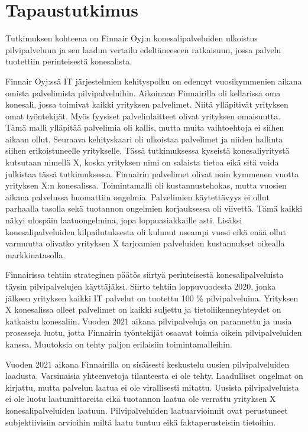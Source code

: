 \chapter{Tapaustutkimus\label{tapautustutkimus}}
Tutkimuksen kohteena on Finnair Oyj:n konesalipalveluiden ulkoistus pilvipalveluun ja sen laadun vertailu edeltäneeseen ratkaisuun, jossa palvelu tuotettiin perinteisestä konesalista.

Finnair Oyj:ssä IT järjestelmien kehityspolku on edennyt vuosikymmenien aikana omista palvelimista pilvipalveluihin. Aikoinaan Finnairilla oli kellarissa oma konesali, jossa toimivat kaikki yrityksen palvelimet. Niitä ylläpitivät yrityksen omat työntekijät. Myös fyysiset palvelinlaitteet olivat yrityksen omaisuutta. Tämä malli ylläpitää palvelimia oli kallis, mutta muita vaihtoehtoja ei siihen aikaan ollut. Seuraava kehityskaari oli ulkoistaa palvelimet ja niiden hallinta siihen erikoistuneelle yritykselle. Tässä tutkimuksessa kyseistä konesaliyritystä kutsutaan nimellä X, koska yrityksen nimi on salaista tietoa eikä sitä voida julkistaa tässä tutkimuksessa. Finnairin palvelimet olivat noin kymmenen vuotta yrityksen X:n konesalissa. Toimintamalli oli kustannustehokas, mutta vuosien aikana palvelussa huomattiin ongelmia. Palvelimien käytettävyys ei ollut parhaalla tasolla sekä tuotannon ongelmien korjauksessa oli viivettä. Tämä kaikki näkyi ulospäin laatuongelmina, jopa loppuasiakkaille asti. Lisäksi konesalipalveluiden kilpailutuksesta oli kulunut useampi vuosi eikä enää ollut varmuutta olivatko yrityksen X tarjoamien palveluiden kustannukset oikealla markkinatasolla.

Finnairissa tehtiin strateginen päätös siirtyä perinteisestä konesalipalveluista täysin pilvipalvelujen käyttäjäksi. Siirto tehtiin loppuvuodesta 2020, jonka jälkeen yrityksen kaikki IT palvelut on tuotettu 100 \% pilvipalveluina. Yrityksen X konesalissa olleet palvelimet on kaikki suljettu ja tietoliikenneyhteydet on katkaistu konesaliin. Vuoden 2021 aikana pilvipalveluja on parannettu ja uusia prosesseja luotu, jotta Finnairin työntekijät osaavat toimia oikein pilvipalveluiden kanssa. Muutoksia on tehty paljon erilaisiin toimintamalleihin.

Vuoden 2021 aikana Finnairilla on sisäisesti keskustelu uusien pilvipalveluiden laadusta. Varsinaisia yhteenvetoja tilanteesta ei ole tehty. Laadulliset ongelmat on kirjattu, mutta palvelun laatua ei ole virallisesti mitattu. Uusista pilvipalveluista ei ole luotu laatumittareita eikä tuotannon laatua ole verrattu yrityksen X konesalipalveluiden laatuun. Pilvipalveluiden laatuarvioinnit ovat perustuneet subjektiivisiin arvioihin miltä laatu tuntuu eikä faktaperusteisiin tietoihin.